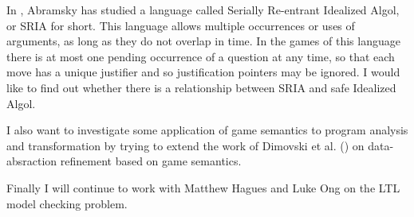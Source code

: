 In \cite{abramsky:mchecking_ia}, Abramsky has studied a language
called Serially Re-entrant Idealized Algol, or SRIA for short. This
language allows multiple occurrences or uses of arguments, as long
as they do not overlap in time. In the games of this language there
is at most one pending occurrence of a question at any time, so that
each move has a unique justifier and so justification pointers may
be ignored. I would like to find out whether there is a relationship
between SRIA and safe Idealized Algol.

I also want to investigate some application of game semantics to
program analysis and transformation by trying to extend the work of
Dimovski et al. (\cite{DBLP:conf/sas/DimovskiGL05}) on
data-absraction refinement based on game semantics.

Finally I will continue to work with Matthew Hagues and Luke Ong on
the LTL model checking problem.
